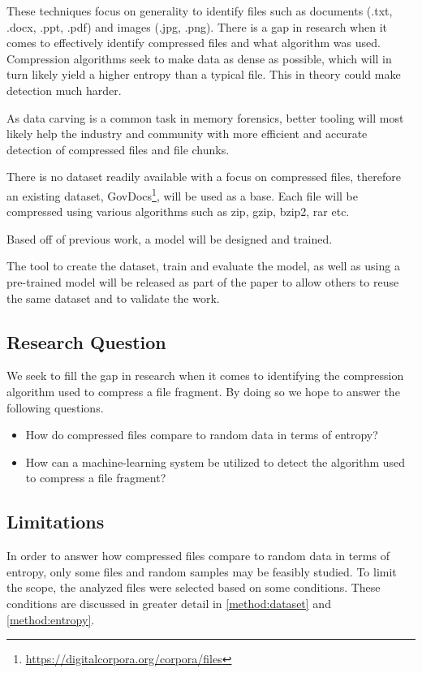 \documentclass[conference]{IEEEtran}
\begin{document}
These techniques focus on generality to identify files such as documents (.txt, .docx, .ppt, .pdf) and images (.jpg, .png). There is a gap in research when it comes to effectively identify compressed files and what algorithm was used. Compression algorithms seek to make data as dense as possible, which will in turn likely yield a higher entropy than a typical file. This in theory could make detection much harder.

As data carving is a common task in memory forensics, better tooling will most likely help the industry and community with more efficient and accurate detection of compressed files and file chunks.

There is no dataset readily available with a focus on compressed files, therefore an existing dataset, GovDocs\footnote{\href{https://digitalcorpora.org/corpora/files}{https://digitalcorpora.org/corpora/files}}, will be used as a base. Each file will be compressed using various algorithms such as zip, gzip, bzip2, rar etc.

Based off of previous work, a model will be designed and trained.

The tool to create the dataset, train and evaluate the model, as well as using a pre-trained model will be released as part of the paper to allow others to reuse the same dataset and to validate the work.

\subsection{Research Question}

We seek to fill the gap in research when it comes to identifying the compression algorithm used to compress a file fragment. By doing so we hope to answer the following questions.

\begin{itemize}
    \item How do compressed files compare to random data in terms of entropy?
    \item How can a machine-learning system be utilized to detect the algorithm used to compress a file fragment?
\end{itemize}

\subsection{Limitations}

In order to answer how compressed files compare to random data in terms of entropy, only some files and random samples may be feasibly studied. To limit the scope, the analyzed files were selected based on some conditions. These conditions are discussed in greater detail in \ref{method:dataset} and \ref{method:entropy}.
\end{document}
